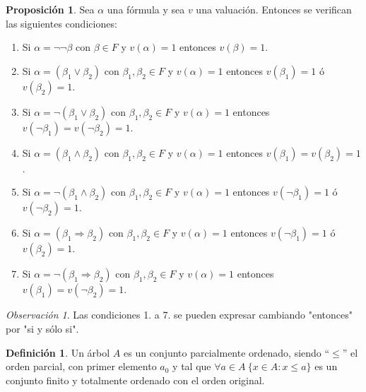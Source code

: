 \documentclass[a4paper,11pt]{article}
\theoremstyle{definition}
\newtheorem{defn}{Definición}[section]
\newtheorem{prop}{Proposición}[section]
\theoremstyle{remark}
\newtheorem*{remk}{Observación}
\begin{document}
\begin{prop}
	Sea $\alpha$ una fórmula y sea $v$ una valuación. Entonces se verifican las siguientes condiciones:
	
	\begin{enumerate}
		\item Si $\alpha = \neg\neg\beta$ con $\beta \in F$ y $v(\alpha) =  1$ entonces $v(\beta) = 1$.
		
		\item Si $\alpha = (\beta_1 \vee \beta_2)$ con $\beta_1, \beta_2 \in F$ y $v(\alpha) = 1$ entonces
		$v(\beta_1) = 1$ ó $v(\beta_2) = 1$.
		
		\item Si $\alpha = \neg(\beta_1 \vee \beta_2)$ con $\beta_1, \beta_2 \in F$ y $v(\alpha) = 1$ entonces
		$v(\neg\beta_1) = v(\neg\beta_2) = 1$.
		
		\item Si $\alpha = (\beta_1 \wedge \beta_2)$ con $\beta_1, \beta_2 \in F$ y $v(\alpha) = 1$ entonces
		$v(\beta_1) = v(\beta_2) = 1$.
		
		\item Si $\alpha = \neg(\beta_1 \wedge \beta_2)$ con $\beta_1, \beta_2 \in F$ y $v(\alpha) = 1$ entonces
		$v(\neg\beta_1) = 1$ ó $v(\neg\beta_2) = 1$.
		
		\item Si $\alpha = (\beta_1 \Rightarrow \beta_2)$ con $\beta_1, \beta_2 \in F$ y $v(\alpha) = 1$ entonces
		$v(\neg\beta_1) = 1$ ó $v(\beta_2) = 1$.
		
		\item Si $\alpha = \neg(\beta_1 \Rightarrow \beta_2)$ con $\beta_1, \beta_2 \in F$ y $v(\alpha) = 1$ entonces
		$v(\beta_1) = v(\neg\beta_2) = 1$.
	\end{enumerate}
\end{prop}

\begin{remk}
	Las condiciones 1. a 7. se pueden expresar cambiando "entonces" por "si y sólo si".
\end{remk}

\begin{defn}
	Un árbol $A$ es un conjunto parcialmente ordenado, siendo ``$\le$'' el orden parcial,
	con primer elemento $a_0$ y tal que $\forall a \in A\ \{x \in A : x \le a\}$ 
	es un conjunto finito y totalmente ordenado con el orden original.
\end{defn}
\end{document}
